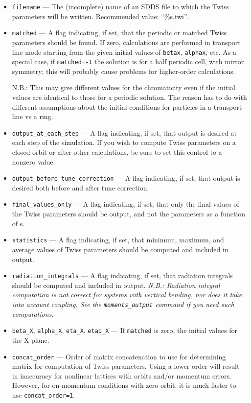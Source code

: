 \documentclass[11pt]{article}
\begin{document}
\begin{itemize}
\item \verb|filename| --- The (incomplete) name of an SDDS file to which the Twiss parameters will be written.
 Recommended value: ``\%s.twi''.
\item \verb|matched| --- A flag indicating, if set, that the periodic or matched Twiss parameters should be found.
  If zero, calculations are performed in transport line mode starting from the given initial values of \verb|betax|, \verb|alphax|,
  etc. 
  As a special case, if \verb|matched=-1| the solution is for a half periodic cell, with mirror symmetry; this will probably
  cause problems for higher-order calculations.

  N.B.: This may give different values for the chromaticity even if the initial values are identical to those for a periodic solution.
  The reason has to do with different assumptions about the initial conditions for particles in a transport line vs a ring.
\item \verb|output_at_each_step| --- A flag indicating, if set, that output is desired at each step of the simulation.
  If you wish to compute Twiss parameters on a closed orbit or after other calculations, be sure to set this control to a nonzero value.
\item \verb|output_before_tune_correction| --- A flag indicating, if set, that output is desired both before and after
tune correction.
\item \verb|final_values_only| --- A flag indicating, if set, that only the final values of the Twiss parameters should
be output, and not the parameters as a function of s.
\item \verb|statistics| --- A flag indicating, if set, that minimum, maximum, and average values of
Twiss parameters should be computed and included in output.
\item \verb|radiation_integrals| --- A flag indicating, if set, that radiation integrals should be computed
and included in output. {\em N.B.: Radiation integral computation is not correct for systems with vertical
bending, nor does it take into account coupling.  See the \verb|moments_output| command if you need such
computations.}
\item \verb|beta_X|, \verb|alpha_X|, \verb|eta_X|, \verb|etap_X| --- If \verb|matched| is zero, the initial values for
the X plane.

\item \verb|concat_order| --- Order of matrix concatenation to use for
determining matrix for computation of Twiss parameters.  Using a lower
order will result in inaccuracy for nonlinear lattices with orbits
and/or momentum errors.  However, for on-momentum conditions with zero
orbit, it is much faster to use \verb|concat_order=1|.


\end{itemize}
\end{document}
